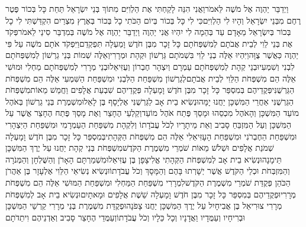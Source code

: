 \documentclass[../main/main.tex]{subfiles}
\begin{document}
\begin{multicols*}{\ncols}
וַיְדַבֵּר יַהְוֶה אֶל מֹשֶׁה לֵּאמֹר\PreVerseSpace{}וַאֲנִי הִנֵּה לָקַחְתִּי אֶת הַלְוִיִּם מִתּוֹךְ בְּנֵי יִשְׂרָאֵל תַּחַת כָּל בְּכוֹר פֶּטֶר רֶחֶם מִבְּנֵי יִשְׂרָאֵל וְהָיוּ לִי הַלְוִיִּם\PreVerseSpace{}כִּי לִי כָּל בְּכוֹר בְּיוֹם הַכֹּתִי כָל בְּכוֹר בְּאֶרֶץ מִצְרַיִם הִקְדַּשְׁתִּי לִי כָל בְּכוֹר בְּיִשְׂרָאֵל מֵאָדָם עַד בְּהֵמָה לִי יִהְיוּ אֲנִי יַהְוֶה \ClosedSection{}וַיְדַבֵּר יַהְוֶה אֶל מֹשֶׁה בְּמִדְבַּר סִינַי לֵאמֹר\PreVerseSpace{}פְּקֹד אֶת בְּנֵי לֵוִי לְבֵית אֲבֹתָם לְמִשְׁפְּחֹתָם כָּל זָכָר מִבֶּן חֹדֶשׁ וָמַעְלָה תִּפְקְדֵם\PreVerseSpace{}וַיִּפְקֹד אֹתָם מֹשֶׁה עַל פִּי יַהְוֶה כַּאֲשֶׁר צֻוָּה\PreVerseSpace{}וַיִּהְיוּ אֵלֶּה בְנֵי לֵוִי בִּשְׁמֹתָם גֵּרְשׁוֹן וּקְהָת וּמְרָרִי\PreVerseSpace{}וְאֵלֶּה שְׁמוֹת בְּנֵי גֵרְשׁוֹן לְמִשְׁפְּחֹתָם לִבְנִי וְשִׁמְעִי\PreVerseSpace{}וּבְנֵי קְהָת לְמִשְׁפְּחֹתָם עַמְרָם וְיִצְהָר חֶבְרוֹן וְעֻזִּיאֵל\PreVerseSpace{}וּבְנֵי מְרָרִי לְמִשְׁפְּחֹתָם מַחְלִי וּמוּשִׁי אֵלֶּה הֵם מִשְׁפְּחֹת הַלֵּוִי לְבֵית אֲבֹתָם\PreVerseSpace{}לְגֵרְשׁוֹן מִשְׁפַּחַת הַלִּבְנִי וּמִשְׁפַּחַת הַשִּׁמְעִי אֵלֶּה הֵם מִשְׁפְּחֹת הַגֵּרְשֻׁנִּי\PreVerseSpace{}פְּקֻדֵיהֶם בְּמִסְפַּר כָּל זָכָר מִבֶּן חֹדֶשׁ וָמָעְלָה פְּקֻדֵיהֶם שִׁבְעַת אֲלָפִים וַחֲמֵשׁ מֵאוֹת\PreVerseSpace{}מִשְׁפְּחֹת הַגֵּרְשֻׁנִּי אַחֲרֵי הַמִּשְׁכָּן יַחֲנוּ יָמָּה\PreVerseSpace{}וּנְשִׂיא בֵית אָב לַגֵּרְשֻׁנִּי אֶלְיָסָף בֶּן לָאֵל\PreVerseSpace{}וּמִשְׁמֶרֶת בְּנֵי גֵרְשׁוֹן בְּאֹהֶל מוֹעֵד הַמִּשְׁכָּן וְהָאֹהֶל מִכְסֵהוּ וּמָסַךְ פֶּתַח אֹהֶל מוֹעֵד\PreVerseSpace{}וְקַלְעֵי הֶחָצֵר וְאֶת מָסַךְ פֶּתַח הֶחָצֵר אֲשֶׁר עַל הַמִּשְׁכָּן וְעַל הַמִּזְבֵּחַ סָבִיב וְאֵת מֵיתָרָיו לְכֹל עֲבֹדָתוֹ \ClosedSection{}וְלִקְהָת מִשְׁפַּחַת הַעַמְרָמִי וּמִשְׁפַּחַת הַיִּצְהָרִי וּמִשְׁפַּחַת הַחֶבְרֹנִי וּמִשְׁפַּחַת הָעָזִּיאֵלִי אֵלֶּה הֵם מִשְׁפְּחֹת הַקְּהָתִי\PreVerseSpace{}בְּמִסְפַּר כָּל זָכָר מִבֶּן חֹדֶשׁ וָמָעְלָה שְׁמֹנַת אֲלָפִים וּשְׁלֹשׁ\SubEnd{} מֵאוֹת שֹׁמְרֵי מִשְׁמֶרֶת הַקֹּדֶשׁ\PreVerseSpace{}מִשְׁפְּחֹת בְּנֵי קְהָת יַחֲנוּ עַל יֶרֶךְ הַמִּשְׁכָּן תֵּימָנָה\PreVerseSpace{}וּנְשִׂיא בֵית אָב לְמִשְׁפְּחֹת הַקְּהָתִי אֱלִיצָפָן בֶּן עֻזִּיאֵל\PreVerseSpace{}וּמִשְׁמַרְתָּם הָאָרֹן וְהַשֻּׁלְחָן וְהַמְּנֹרָה וְהַמִּזְבְּחֹת וּכְלֵי הַקֹּדֶשׁ אֲשֶׁר יְשָׁרְתוּ בָּהֶם וְהַמָּסָךְ וְכֹל עֲבֹדָתוֹ\PreVerseSpace{}וּנְשִׂיא נְשִׂיאֵי הַלֵּוִי אֶלְעָזָר בֶּן אַהֲרֹן הַכֹּהֵן פְּקֻדַּת שֹׁמְרֵי מִשְׁמֶרֶת הַקֹּדֶשׁ\PreVerseSpace{}לִמְרָרִי מִשְׁפַּחַת הַמַּחְלִי וּמִשְׁפַּחַת הַמּוּשִׁי אֵלֶּה הֵם מִשְׁפְּחֹת מְרָרִי\PreVerseSpace{}וּפְקֻדֵיהֶם בְּמִסְפַּר כָּל זָכָר מִבֶּן חֹדֶשׁ וָמָעְלָה שֵׁשֶׁת אֲלָפִים וּמָאתָיִם\PreVerseSpace{}וּנְשִׂיא בֵית אָב לְמִשְׁפְּחֹת מְרָרִי צוּרִיאֵל בֶּן אֲבִיחָיִל עַל יֶרֶךְ הַמִּשְׁכָּן יַחֲנוּ צָפֹנָה\PreVerseSpace{}וּפְקֻדַּת מִשְׁמֶרֶת בְּנֵי מְרָרִי קַרְשֵׁי הַמִּשְׁכָּן וּבְרִיחָיו וְעַמֻּדָיו וַאֲדָנָיו וְכָל כֵּלָיו וְכֹל עֲבֹדָתוֹ\PreVerseSpace{}וְעַמֻּדֵי הֶחָצֵר סָבִיב וְאַדְנֵיהֶם וִיתֵדֹתָם 
\end{multicols*}
\end{document}

